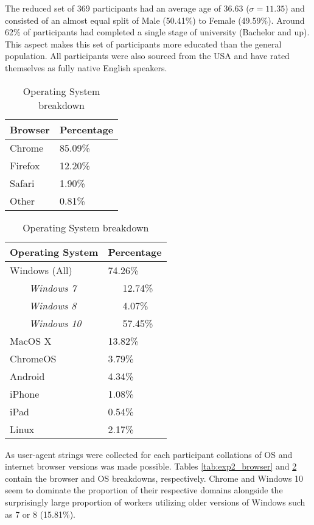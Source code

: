 The reduced set of 369 participants had an average age of 36.63 ($\sigma = 11.35$) and consisted of an almost equal split of Male (50.41\%) to Female (49.59\%). Around 62\% of participants had completed a single stage of university (Bachelor and up). This aspect makes this set of participants more educated than the general population. All participants were also sourced from the USA and have rated themselves as fully native English speakers.
\begin{table}[!h]
    \centering
    \begin{tabular}{|l|l|}
        \hline
        Browser & Percentage \\
        \hline
        Chrome & 85.09\% \\
        Firefox & 12.20\% \\
        Safari & 1.90\% \\
        Other & 0.81\% \\
        \hline
    \end{tabular}
    \caption{Internet Browser breakdown}
    \label{tab:exp2_browser}
    \begin{tabular}{|l|l|}
        \hline
        Operating System & Percentage \\
        \hline
        
        \hline
        Windows (All) & 74.26\% \\
        ~~~~\textit{Windows 7} & ~~~12.74\% \\
        ~~~~\textit{Windows 8} & ~~~4.07\% \\
        ~~~~\textit{Windows 10} & ~~~57.45\% \\
        MacOS X	 & 13.82\% \\
        ChromeOS & 3.79\% \\
        Android	& 4.34\% \\
        iPhone	& 1.08\% \\
        iPad	& 0.54\% \\
        Linux	& 2.17\% \\
        \hline
    \end{tabular}
    \caption{Operating System breakdown}
    \label{tab:exp2_os}
\end{table}
    
As user-agent strings were collected for each participant collations of OS and internet browser versions was made possible. Tables \ref{tab:exp2_browser} and \ref{tab:exp2_os} contain the browser and OS breakdowns,  respectively. Chrome and Windows 10 seem to dominate the proportion of their respective domains alongside the surprisingly large proportion of workers utilizing older versions of Windows such as 7 or 8 (15.81\%).

